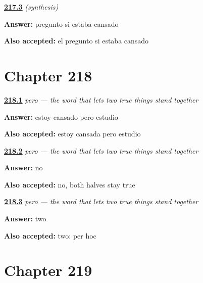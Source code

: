 \noindent\begin{minipage}[t]{\linewidth}
\raggedright
\hyperlink{review-ES-C57-sintesis-reportar-three}{\textbf{217.3}} \emph{(synthesis)}\par
\small \textbf{Answer:} pregunto si estaba cansado\par
\footnotesize \textbf{Also accepted:} el pregunto si estaba cansado
\end{minipage}\par\medskip

\section*{Chapter 218}

\noindent\begin{minipage}[t]{\linewidth}
\raggedright
\hyperlink{review-ES-C58-pero-say}{\textbf{218.1}} \emph{pero — the word that lets two true things stand together}\par
\small \textbf{Answer:} estoy cansado pero estudio\par
\footnotesize \textbf{Also accepted:} estoy cansada pero estudio
\end{minipage}\par\medskip

\noindent\begin{minipage}[t]{\linewidth}
\raggedright
\hyperlink{review-ES-C58-pero-keeps}{\textbf{218.2}} \emph{pero — the word that lets two true things stand together}\par
\small \textbf{Answer:} no\par
\footnotesize \textbf{Also accepted:} no, both halves stay true
\end{minipage}\par\medskip

\noindent\begin{minipage}[t]{\linewidth}
\raggedright
\hyperlink{review-ES-C58-pero-origin}{\textbf{218.3}} \emph{pero — the word that lets two true things stand together}\par
\small \textbf{Answer:} two\par
\footnotesize \textbf{Also accepted:} two: per hoc
\end{minipage}\par\medskip

\section*{Chapter 219}

